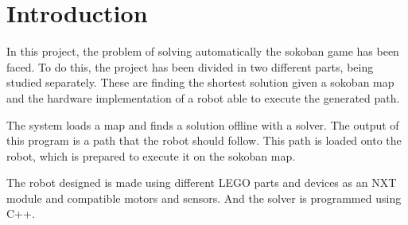 \section{Introduction}

In this project, the problem of solving automatically the sokoban game has been faced.
To do this, the project has been divided in two different parts, being studied separately.
These are finding the shortest solution given a sokoban map and the hardware implementation of a robot able to execute the generated path.

The system loads a map and finds a solution offline with a solver. 
The output of this program is a path that the robot should follow. 
This path is loaded onto the robot, which is prepared to execute it on the sokoban map.

The robot designed is made using different LEGO parts and devices as an NXT module and compatible motors and sensors.
And the solver is programmed using C++.

